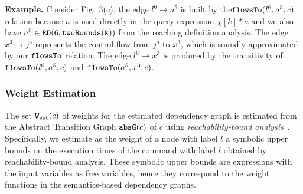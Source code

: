 \textbf{Example.}
Consider Fig.~3(c),  
the edge $l^6 \to a^5$ is built by tbe$\mathtt{flowsTo}(l^6, a^5, c)$ relation because
$a$ is used directly in the query expression $\chi[k]*a$
and we also have $a^5 \in \mathtt{RD}(6, \mathtt{twoRounds(k)})$ from the reaching definition analysis.
The edge $x^3 \to j^5$  represents the control flow from $j^5$ to $x^3$, which is soundly approximated by our $\mathtt{flowsTo}$ relation.
The edge $l^6 \to x^3$ is produced by the transitivity of $\mathtt{flowsTo}(l^6, a^5, c)$ and $\mathtt{flowsTo}(a^5, x^3, c)$. 

\subsubsection{Weight Estimation}
\label{sec:alg_weightgen}
The set $\mathtt{{W_{est}}}(c)$ of weights for the estimated dependency graph is estimated from the Abstract Transition Graph $\mathtt{abs}{\mathtt{G}}(c)$ of $c$ using \emph{reachability-bound analysis}~\cite{GulwaniZ10}. Specifically, we estimate as the weight of a node with label $l$ a symbolic upper bounds on the execution times of the command with label $l$ obtained by reachability-bound analysis. These symbolic upper bounds are expressions with the input variables as free variables, hence they correspond to the weight functions in the semantics-based dependency graphs. 
%

